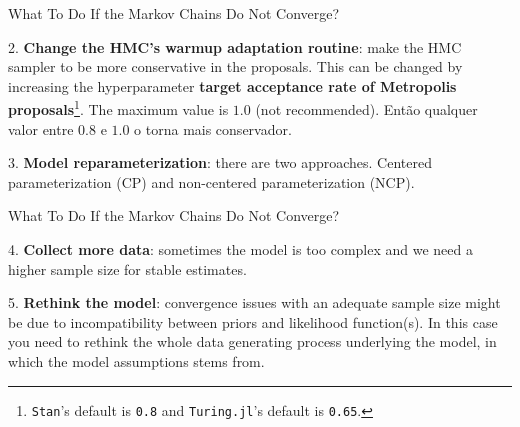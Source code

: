 \begin{frame}{What To Do If the Markov Chains Do Not Converge?}
	\begin{vfilleditems}
		\item[2.] \textbf{Change the HMC's warmup adaptation routine}:
		make the HMC sampler to be more conservative in the proposals.
		This can be changed by increasing the hyperparameter
		\textbf{target acceptance rate of Metropolis proposals}\footnote{
			\texttt{Stan}'s default is \texttt{0.8} and
			\texttt{Turing.jl}'s default is \texttt{0.65}.}.
		The maximum value is $1.0$ (not recommended).
		Então qualquer valor entre $0.8$ e $1.0$ o torna mais conservador.
		\item[3.] \textbf{Model reparameterization}:
		there are two approaches.
		Centered parameterization (CP) and non-centered parameterization (NCP).
	\end{vfilleditems}
\end{frame}

\begin{frame}{What To Do If the Markov Chains Do Not Converge?}
	\begin{vfilleditems}
		\item[4.] \textbf{Collect more data}:
		sometimes the model is too complex and we need a higher sample size for stable estimates.
		\item[5.] \textbf{Rethink the model}:
		convergence issues with an adequate sample size might be due to
		incompatibility between priors and likelihood function(s).
		In this case you need to rethink the whole data generating process
		underlying the model, in which the model assumptions stems from.
	\end{vfilleditems}
\end{frame}
